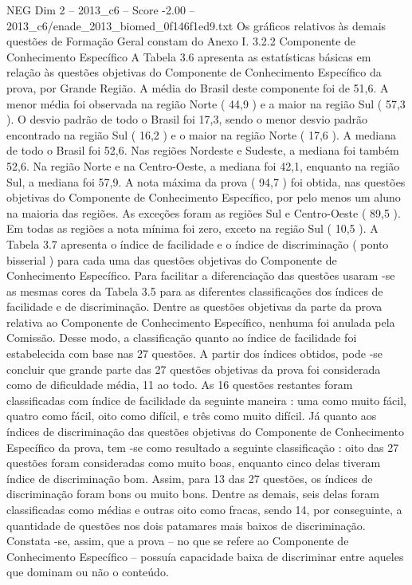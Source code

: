 \begin{textsample}{NEG Dim 2 – 2013\_c6 – Score -2.00 – 2013\_c6/enade\_2013\_biomed\_0f146f1ed9.txt}
Os gráficos relativos às demais questões de Formação Geral constam do Anexo I. 3.2.2 Componente de Conhecimento Específico A Tabela 3.6 apresenta as estatísticas básicas em relação às questões objetivas do Componente de Conhecimento Específico da prova, por Grande Região.
A média do Brasil deste componente foi de 51,6.
A menor média foi observada na região Norte ( 44,9 ) e a maior na região Sul ( 57,3 ).
O desvio padrão de todo o Brasil foi 17,3, sendo o menor desvio padrão encontrado na região Sul ( 16,2 ) e o maior na região Norte ( 17,6 ).
A mediana de todo o Brasil foi 52,6.
Nas regiões Nordeste e Sudeste, a mediana foi também 52,6.
Na região Norte e na Centro-Oeste, a mediana foi 42,1, enquanto na região Sul, a mediana foi 57,9.
A nota máxima da prova ( 94,7 ) foi obtida, nas questões objetivas do Componente de Conhecimento Específico, por pelo menos um aluno na maioria das regiões.
As exceções foram as regiões Sul e Centro-Oeste ( 89,5 ).
Em todas as regiões a nota mínima foi zero, exceto na região Sul ( 10,5 ).
A Tabela 3.7 apresenta o índice de facilidade e o índice de discriminação ( ponto bisserial ) para cada uma das questões objetivas do Componente de Conhecimento Específico.
Para facilitar a diferenciação das questões usaram -se as mesmas cores da Tabela 3.5 para as diferentes classificações dos índices de facilidade e de discriminação.
Dentre as questões objetivas da parte da prova relativa ao Componente de Conhecimento Específico, nenhuma foi anulada pela Comissão.
Desse modo, a classificação quanto ao índice de facilidade foi estabelecida com base nas 27 questões.
A partir dos índices obtidos, pode -se concluir que grande parte das 27 questões objetivas da prova foi considerada como de dificuldade média, 11 ao todo.
As 16 questões restantes foram classificadas com índice de facilidade da seguinte maneira : uma como muito fácil, quatro como fácil, oito como difícil, e três como muito difícil.
Já quanto aos índices de discriminação das questões objetivas do Componente de Conhecimento Específico da prova, tem -se como resultado a seguinte classificação : oito das 27 questões foram consideradas como muito boas, enquanto cinco delas tiveram índice de discriminação bom.
Assim, para 13 das 27 questões, os índices de discriminação foram bons ou muito bons.
Dentre as demais, seis delas foram classificadas como médias e outras oito como fracas, sendo 14, por conseguinte, a quantidade de questões nos dois patamares mais baixos de discriminação.
Constata -se, assim, que a prova – no que se refere ao Componente de Conhecimento Específico – possuía capacidade baixa de discriminar entre aqueles que dominam ou não o conteúdo.

\end{textsample}
